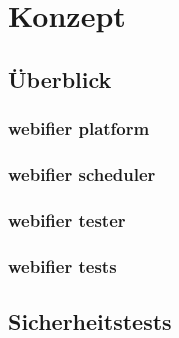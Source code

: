 \chapter{Konzept}

\section{Überblick}

\subsection{webifier platform}

\subsection{webifier scheduler}

\subsection{webifier tester}

\subsection{webifier tests}

\section{Sicherheitstests}
